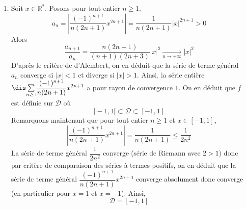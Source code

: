 \documentclass[a4paper,10pt]{report}
\newcommand{\Sum}[2]{\ensuremath{\textstyle{\sum\limits_{#1}^{#2}}}}
\begin{document}
\begin{enumerate}
\item Soit $x \in \mathbb{R}^*$. Posons pour tout entier $n \geq 1$,
$$ a_n = \left\vert \dfrac{(-1)^{n+1}}{n(2n+1)} x^{2n+1} \right\vert = \dfrac{1}{n(2n+1)} \vert x \vert ^{2n+1} >0$$
Alors 
$$ \dfrac{a_{n+1}}{a_n} = \dfrac{n(2n+1)}{(n+1)(2n+3)} \vert x \vert^2 \underset{n \rightarrow + \infty}{\longrightarrow} \vert x \vert^2$$
D'après le critère de d'Alembert, on en déduit que la série de terme général $a_n$ converge si $\vert x \vert<1$ et diverge si $\vert x \vert >1$. Ainsi, la série entière $\dis \Sum{n \geq 1}{} \dfrac{(-1)^{n+1}}{n(2n+1)} x^{2n+1}$ a pour rayon de convergence $1$. On en déduit que $f$ est définie sur $\mathcal{D}$ où
$$ ]-1,1[ \subset \mathcal{D} \subset [-1,1]$$
Remarquons maintenant que pour tout entier $n \geq 1$ et $x \in [-1,1]$,
$$ \left\vert \dfrac{(-1)^{n+1}}{n(2n+1)} x^{2n+1} \right\vert= \dfrac{1}{n(2n+1)} \leq \dfrac{1}{2n^2}$$
La série de terme général $\dfrac{1}{2n^2}$ converge (série de Riemann avec $2>1$) donc par critère de comparaison des séries à termes positifs, on en déduit que la série de terme général $\dfrac{(-1)^{n+1}}{n(2n+1)} x^{2n+1}$ converge absolument donc converge (en particulier pour $x=1$ et $x=-1$). Ainsi,
$$ \mathcal{D}= [-1,1]$$


\end{enumerate}
\end{document}
